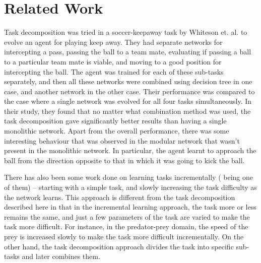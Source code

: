 \section{Related Work}
\label{sec:RW}
Task decomposition was tried in a soccer-keepaway task by Whiteson et. al. \cite{Whiteson2005} to evolve an agent for playing keep away. They had separate networks for intercepting a pass, passing the ball to a team mate, evaluating if passing a ball to a particular team mate is viable, and moving to a good position for intercepting the ball. The agent was trained for each of these sub-tasks separately, and then all these networks were combined using decision tree in one case, and another network in the other case. Their performance was compared to the case where a single network was evolved for all four tasks simultaneously. In their study, they found that no matter what combination method was used, the task decomposition gave significantly better results than having a single monolithic network.  Apart from the overall performance, there was some interesting behaviour that was observed in the modular network that wasn’t present in the monolithic network. In particular, the agent learnt to approach the ball from the direction opposite to that in which it was going to kick the ball.

There has also been some work done on learning tasks incrementally (\nocite{Gomez1997} being one of them) -- starting with a simple task, and slowly increasing the task difficulty as the network learns. This approach is different from the task decomposition described here in that in the incremental learning approach, the task more or less remains the same, and just a few parameters of the task are varied to make the task more difficult. For instance, in the predator-prey domain, the speed of the prey is increased slowly to make the task more difficult incrementally. On the other hand, the task decomposition approach divides the task into specific sub-tasks and later combines them.
